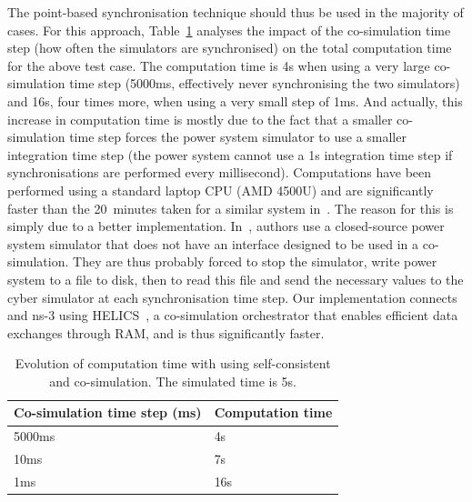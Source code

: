 The point-based synchronisation technique should thus be used in the majority of cases. For this approach, Table~\ref{tab:CosimComputationTime} analyses the impact of the co-simulation time step (\ie how often the simulators are synchronised) on the total computation time for the above test case. The computation time is 4s when using a very large co-simulation time step (5000ms, effectively never synchronising the two simulators) and 16s, four times more, when using a very small step of 1ms. And actually, this increase in computation time is mostly due to the fact that a smaller co-simulation time step forces the power system simulator to use a smaller integration time step (the power system cannot use a 1s integration time step if synchronisations are performed every millisecond). Computations have been performed using a standard laptop CPU (AMD 4500U) and are significantly faster than the 20~minutes taken for a similar system in~\cite{GECOcomputationTime}. The reason for this is simply due to a better implementation. In~\cite{GECOcomputationTime}, authors use a closed-source power system simulator that does not have an interface designed to be used in a co-simulation. They are thus probably forced to stop the simulator, write power system to a file to disk, then to read this file and send the necessary values to the cyber simulator at each synchronisation time step. Our implementation connects \Dynawo{} and ns-3 using HELICS~\cite{HELICS}, a co-simulation orchestrator that enables efficient data exchanges through RAM, and is thus significantly faster.

\begin{table}
\centering
\caption{Evolution of computation time with using self-consistent and co-simulation. The simulated time is 5s.}
\begin{tabular}{@{}ll@{}}
\toprule
Co-simulation time step (ms) & Computation time \\ \midrule
5000ms                       & 4s               \\
10ms                         & 7s               \\
1ms                          & 16s              \\ \bottomrule
\end{tabular}
\label{tab:CosimComputationTime}
\end{table}
